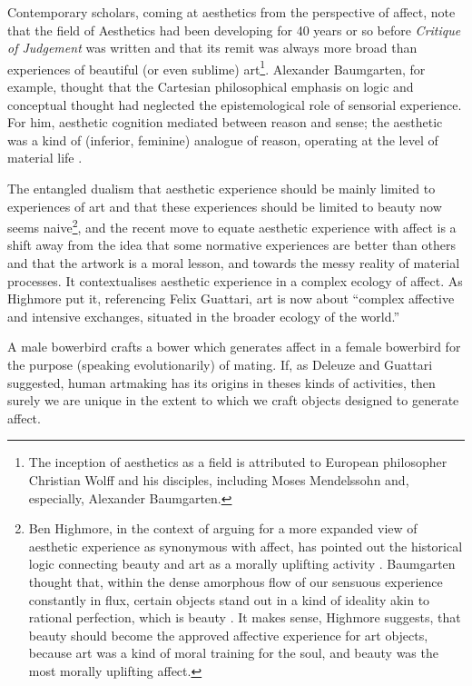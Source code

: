 \documentclass[letterpaper]{article}
\begin{document}
    Contemporary scholars, coming at aesthetics from the perspective of affect, note that the field of Aesthetics had been developing for 40 years or so before \emph{Critique of Judgement} was written and that its remit was always more broad than experiences of beautiful (or even sublime) art\footnote{
        The inception of aesthetics as a field is attributed to European philosopher Christian Wolff and his disciples, including Moses Mendelssohn and, especially, Alexander Baumgarten.
    }. Alexander Baumgarten, for example, thought that the Cartesian philosophical emphasis on logic and conceptual thought had neglected the epistemological role of sensorial experience. For him, aesthetic cognition mediated between reason and sense; the aesthetic was a kind of (inferior, feminine) analogue of reason, operating at the level of material life \citep[pp.327-338]{EagletonFrPrtclrs1990}. 
        
    The entangled dualism that aesthetic experience should be mainly limited to experiences of art and that these experiences should be limited to beauty now seems naive\footnote{
        Ben Highmore, in the context of arguing for a more expanded view of aesthetic experience as synonymous with affect, has pointed out the historical logic connecting beauty and art as a morally uplifting activity \citep[p.121-122]{HighmoreBttrAftrTst2010}. Baumgarten thought that, within the dense amorphous flow of our sensuous experience constantly in flux, certain objects stand out in a kind of ideality akin to rational perfection, which is beauty \citep[p.328]{EagletonFrPrtclrs1990}. It makes sense, Highmore suggests, that beauty should become the approved affective experience for art objects, because art was a kind of moral training for the soul, and beauty was the most morally uplifting affect.
    }, and the recent move to equate aesthetic experience with affect is a shift away from the idea that some normative experiences are better than others and that the artwork is a moral lesson, and towards the messy reality of material processes. It contextualises aesthetic experience in a complex ecology of affect. As Highmore put it, referencing Felix Guattari, art is now about “complex affective and intensive exchanges, situated in the broader ecology of the world.” \citep[p.155]{HighmoreBttrAftrTst2010}

    A male bowerbird crafts a bower which generates affect in a female bowerbird for the purpose (speaking evolutionarily) of mating. If, as Deleuze and Guattari suggested, human artmaking has its origins in theses kinds of activities, then surely we are unique in the extent to which we craft objects designed to generate affect.
    
\end{document}
